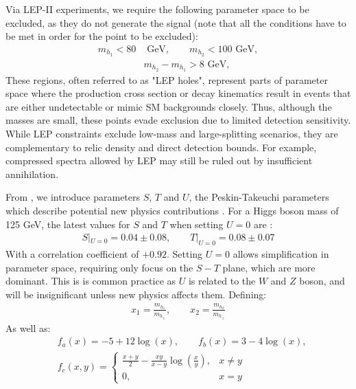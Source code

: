 \documentclass[12pt]{article}
\begin{document}
Via LEP-II experiments, we require the following parameter space to be excluded, as they do not generate the signal (note that all the conditions have to be met in order for the point to be excluded):
\begin{equation}
    \begin{split}
        m_{h_1} < 80 &\text{ GeV}, \qquad
        m_{h_2} < 100 \text{ GeV},
        \\
        &m_{h_2} - m_{h_1} > 8\text{ GeV},
    \end{split}
\label{LEP-3}
\end{equation}
These regions, often referred to as "LEP holes", represent parts of parameter space where the production cross section or decay kinematics result in events that are either undetectable or mimic SM backgrounds closely. Thus, although the masses are small, these points evade exclusion due to limited detection sensitivity. While LEP constraints exclude low-mass and large-splitting scenarios, they are complementary to relic density and direct detection bounds. For example, compressed spectra allowed by LEP may still be ruled out by insufficient annihilation.

From \cite{gfitter2018}, we introduce parameters $S$, $T$ and $U$, the Peskin-Takeuchi parameters \cite{PeskinTakeuchi1990} which describe potential new physics contributions . For a Higgs boson mass of 125 GeV, the latest values for $S$ and $T$ when setting $U = 0$ are \cite{gfitter2018}:
 \begin{align}
     S|_{U=0} = 0.04 \pm0.08, \qquad
     T|_{U=0} = 0.08\pm0.07
 \end{align}
With a correlation coefficient of $+0.92$. Setting $U = 0$ allows simplification in parameter space, requiring only focus on the $S-T$ plane, which are more dominant. This is is common practice as $U$ is related to the $W$ and $Z$ boson, and will be insignificant unless new physics affects them. Defining:
\begin{align}
    x_1 = \frac{m_{h_1}}{m_{h_\pm}}, \qquad 
    x_2 = \frac{m_{h_2}}{m_{h_\pm}}
\end{align}
As well as:
\begin{align}
    &f_a(x) = -5 +12\log(x), \qquad f_b(x) = 3-4\log(x),
    \\
    &f_c(x,y) = 
    \begin{cases}
        \frac{x+y}{2}-\frac{xy}{x-y}\log{\left(\frac{x}{y}\right)}, & x\neq y\\
        0, & x = y
    \end{cases}
\end{align}
\end{document}
